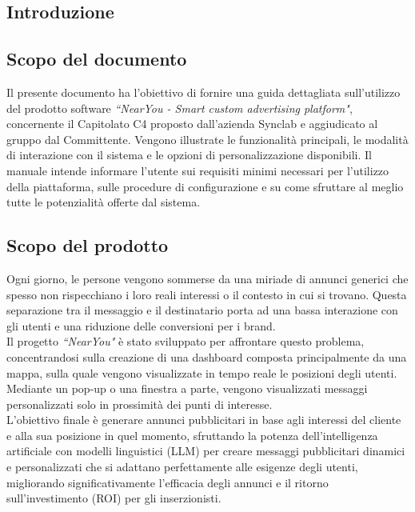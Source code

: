 \documentclass[10pt]{article}
\begin{document}
\newpage
\begin{justify}

\section{Introduzione}
\label{sec:introduzione}

\subsection{Scopo del documento}
Il presente documento ha l'obiettivo di fornire una guida dettagliata sull'utilizzo del prodotto software \textit{``NearYou - Smart custom advertising platform"}, concernente il Capitolato C4 proposto dall'azienda Synclab e aggiudicato al gruppo dal Committente. Vengono illustrate le funzionalità principali, le modalità di interazione con il sistema e le opzioni di personalizzazione disponibili. Il manuale intende informare l'utente sui requisiti minimi necessari per l'utilizzo della piattaforma, sulle procedure di configurazione e su come sfruttare al meglio tutte le potenzialità offerte dal sistema.

\subsection{Scopo del prodotto}
Ogni giorno, le persone vengono sommerse da una miriade di annunci generici che spesso non rispecchiano i loro reali interessi o il contesto in cui si trovano. Questa separazione tra il messaggio e il destinatario porta ad una bassa interazione con gli utenti e una riduzione delle conversioni per i brand.\\
Il progetto \textit{``NearYou"} è stato sviluppato per affrontare questo problema, concentrandosi sulla creazione di una dashboard composta principalmente da una mappa, sulla quale vengono visualizzate in tempo reale le posizioni degli utenti. Mediante un pop-up o una finestra a parte, vengono visualizzati messaggi personalizzati solo in prossimità dei punti di interesse.\\
L'obiettivo finale è generare annunci pubblicitari in base agli interessi del cliente e alla sua posizione in quel momento, sfruttando la potenza dell'intelligenza artificiale con modelli linguistici (LLM) per creare messaggi pubblicitari dinamici e personalizzati che si adattano perfettamente alle esigenze degli utenti, migliorando significativamente l'efficacia degli annunci e il ritorno sull'investimento (ROI) per gli inserzionisti.


\end{justify}
\end{document}
